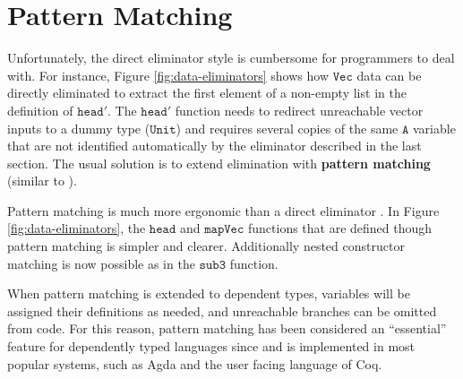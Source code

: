 
\section{Pattern Matching}

Unfortunately, the direct eliminator style is cumbersome for programmers to deal with.
For instance, Figure \ref{fig:data-eliminators} shows how $\mathtt{Vec}$ data can be directly eliminated to extract the first element of a non-empty list in the definition of $\mathtt{head'}$.
The $\mathtt{head'}$ function needs to redirect unreachable vector inputs to a dummy type ($\mathtt{Unit}$) and requires several copies of the same $\mathtt{A}$ variable that are not identified automatically by the eliminator described in the last section.
The usual solution is to extend \case{} elimination with \textbf{pattern matching} (similar to \cite{coquand1992pattern}).
 
Pattern matching is much more ergonomic than a direct eliminator \case{}.
In Figure \ref{fig:data-eliminators}, the $\mathtt{head}$ and $\mathtt{mapVec}$ functions that are defined though pattern matching is simpler and clearer.
Additionally nested constructor matching is now possible as in the $\mathtt{sub3}$ function.

When pattern matching is extended to dependent types, variables will be assigned their definitions as needed, and unreachable branches can be omitted from code.
For this reason, pattern matching has been considered an ``essential'' feature for dependently typed languages since \cite{coquand1992pattern} and is implemented in most popular systems, such as Agda and the user facing language of Coq.


